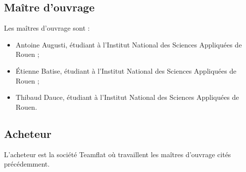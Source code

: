 \subsection{Maître d'ouvrage}
Les maîtres d'ouvrage sont :
\begin{itemize}
	\item Antoine Augusti, étudiant à l'Institut National des Sciences Appliquées de Rouen ; 
	\item Étienne Batise, étudiant à l'Institut National des Sciences Appliquées de Rouen ; 
	\item Thibaud Dauce, étudiant à l'Institut National des Sciences Appliquées de Rouen.
\end{itemize}

\subsection{Acheteur}
L'acheteur est la société Teamflat où travaillent les maîtres d'ouvrage cités précédemment.